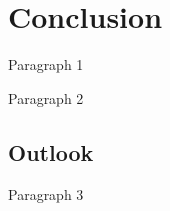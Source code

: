 \chapter{Conclusion}
\label{cha:conclusion}

Paragraph 1

Paragraph 2

\section{Outlook}
\label{cha:outlook}

Paragraph 3

